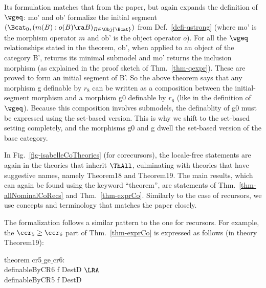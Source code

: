 Its formulation matches that from the paper, but again expands the definition of $\wgeq$: \textsf{mo'} 
and \textsf{ob'} formalize the initial segment $(\Bcat_0,(m(B):o(B)\ra B)_{B \in \Obj{\Bcat}})$ from Def.~\ref{defi-qstrong} 
(where \textsf{mo'}  is the morphism operator $m$ and \textsf{ob'} is the object operator $o$). 
For all the $\wgeq$ relationships stated in the theorem, \textsf{ob'}, when applied to an object of the category \textsf{B'}, 
returns its minimal submodel  %
and \textsf{mo'} returns the inclusion morphism (as explained in the proof sketch of Thm.~\ref{thm-qexpr}). These are proved to form an initial segment of \textsf{B'}. 
So the above theorem says that any morphism \textsf{g} definable by $r_8$ can be written as a composition 
between the initial-segment morphism and a morphism \textsf{g0} definable by $r_6$ (like in the definition of $\wgeq$). 
Because this composition involves submodels, the definablity of \textsf{g0} must be expressed using the set-based version. This is why we shift to the set-based setting completely, and  
the morphisms \textsf{g0} and \textsf{g} dwell the set-based version of the base category. 





\bigskip 
In Fig.~\ref{fig-isabelleCoTheories} (for corecursors), the locale-free statements are again in the theories that inherit 
$\ThAll$, culminating with theories that have suggestive names, namely \textsf{Theorem18} and \textsf{Theorem19}. 
The main results, which can again be found using the keyword ``theorem'',  
are statements of Thm.~\ref{thm-allNominalCoRecs} and Thm.~\ref{thm-exprCo}. Similarly to the case of recursors, we 
use concepts and terminology that matches the paper closely.  

The formalization follows a similar pattern to the one 
for recursors. For example, the $\ccr_5 \geq \ccr_6$ part of Thm.~\ref{thm-exprCo} is expressed as follows (in theory \textsf{Theorem19}): 

\medskip 
\noindent 
\textsf{
	theorem cr5$\_$\allowbreak{}ge$\_$\allowbreak{}cr6:
	\\\hspace*{3ex}definableByCR6 f DestD $\LRA$
	\\\hspace*{3ex}definableByCR5 f DestD
} 




